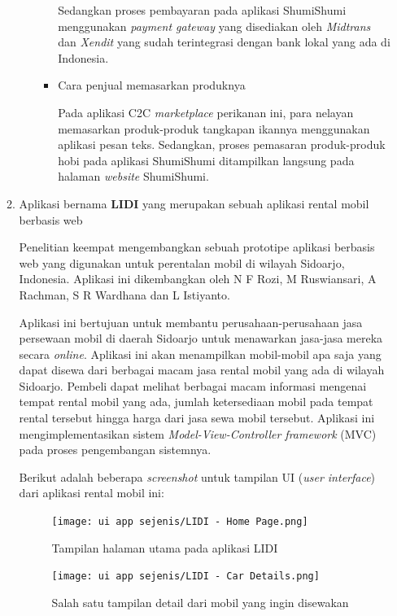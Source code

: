 \documentclass[a4paper]{article}
\begin{document}
\begin{itemize}
\begin{enumerate}
\begin{itemize}
\begin{itemize}
                Sedangkan proses pembayaran pada aplikasi ShumiShumi menggunakan \textit{payment gateway} yang disediakan oleh \textit{Midtrans} dan \textit{Xendit} yang sudah terintegrasi dengan bank lokal yang ada di Indonesia.
    
                \item Cara penjual memasarkan produknya
    
                Pada aplikasi C2C \textit{marketplace} perikanan ini, para nelayan memasarkan produk-produk tangkapan ikannya menggunakan aplikasi pesan teks\autocite{c2c-fish-marketplace}. Sedangkan, proses pemasaran produk-produk hobi pada aplikasi ShumiShumi ditampilkan langsung pada halaman \textit{website} ShumiShumi.
    
            \end{itemize}
    
        \end{itemize}
    
        \item Aplikasi bernama \textbf{LIDI} yang merupakan sebuah aplikasi rental mobil berbasis web
    
        Penelitian keempat mengembangkan sebuah prototipe aplikasi berbasis web yang digunakan untuk perentalan mobil di wilayah Sidoarjo, Indonesia. Aplikasi ini dikembangkan oleh N F Rozi, M Ruswiansari, A Rachman, S R Wardhana dan L Istiyanto\autocite{lidi-car-rental}.
    
        Aplikasi ini bertujuan untuk membantu perusahaan-perusahaan jasa persewaan mobil di daerah Sidoarjo untuk menawarkan jasa-jasa mereka secara \textit{online}. Aplikasi ini akan menampilkan mobil-mobil apa saja yang dapat disewa dari berbagai macam jasa rental mobil yang ada di wilayah Sidoarjo. Pembeli dapat melihat berbagai macam informasi mengenai tempat rental mobil yang ada, jumlah ketersediaan mobil pada tempat rental tersebut hingga harga dari jasa sewa mobil tersebut. Aplikasi ini mengimplementasikan sistem \textit{Model-View-Controller framework} (MVC) pada proses pengembangan sistemnya\autocite{lidi-car-rental}.
    
        Berikut adalah beberapa \textit{screenshot} untuk tampilan UI (\textit{user interface}) dari aplikasi rental mobil ini:
    
        \begin{figure}[h]
            \centering
            \texttt{[image: ui app sejenis/LIDI - Home Page.png]}
            \caption{Tampilan halaman utama pada aplikasi LIDI}
        \end{figure}
        \newpage
        \begin{figure}[h]
            \centering
            \texttt{[image: ui app sejenis/LIDI - Car Details.png]}
            \caption{Salah satu tampilan detail dari mobil yang ingin disewakan}
        \end{figure}
    

\end{enumerate}
\end{itemize}
\end{document}
